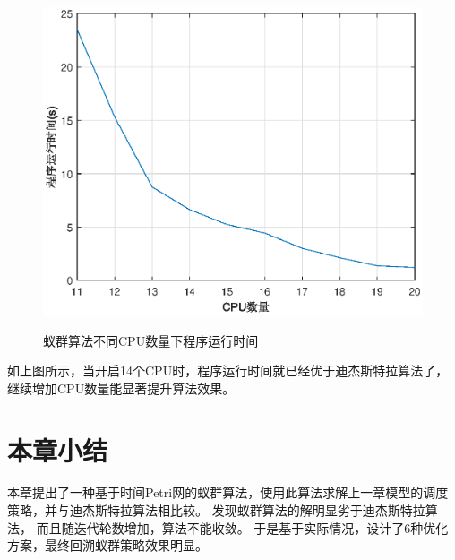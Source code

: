\begin{table}[H]
	\centering
	\caption{各寿命上限机制与寿命上限与迭代轮数关系}
\end{table}

\begin{figure}[H]
	\centering
	\includegraphics[scale=1.00,angle=0]{figures/test5.eps}\\
	\caption{蚁群算法不同CPU数量下程序运行时间}
\end{figure}

如上图所示，当开启14个CPU时，程序运行时间就已经优于迪杰斯特拉算法了，继续增加CPU数量能显著提升算法效果。

\section{本章小结}
本章提出了一种基于时间Petri网的蚁群算法，使用此算法求解上一章模型的调度策略，并与迪杰斯特拉算法相比较。
发现蚁群算法的解明显劣于迪杰斯特拉算法，
而且随迭代轮数增加，算法不能收敛。
于是基于实际情况，设计了6种优化方案，最终回溯蚁群策略效果明显。